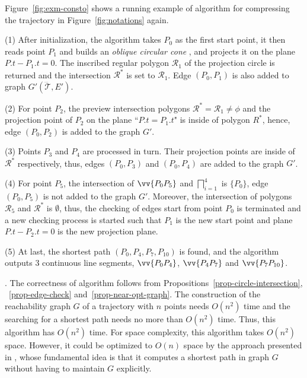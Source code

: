 \begin{example}
\label{exm-alg-conesto}
Figure~\ref{fig:exm-consto}  shows a running example of algorithm \cisto for compressing the trajectory  in Figure~\ref{fig:notations} again.


\sstab (1) After initialization, the \cisto algorithm takes $P_0$ as the first start point, it then reads point $P_1$ and builds an \emph{oblique circular cone} ,  and projects it on the plane $P.t-P_1.t=0$. The inscribed
regular polygon $\mathcal{R}_1$ of the projection circle is returned and the intersection $\mathcal{R}^*$ is set to $\mathcal{R}_1$.
Edge $(P_0,P_{1})$ is also added to graph $G'(\dddot{\mathcal{T}},E')$. 

\sstab (2) For point $P_2$, the preview intersection
polygons $\mathcal{R}^*=\mathcal{R}_1 \ne \phi$ and the projection point of $P_2$ on the plane ``$P.t = P_1.t$" is inside of polygon $R^*$, hence, edge $(P_0,P_{2})$ is added to the graph $G'$. 

\sstab (3) Points $P_3$ and $P_4$ are processed in turn. Their projection points are inside of $\mathcal{R}^*$ respectively, thus, edges $(P_0,P_{3})$ and $(P_0,P_{4})$ are added to the graph $G'$. 


\sstab (4) For point $P_5$, the intersection of $\vv{P_0P_{5}}$ and $\bigsqcap_{i=1}^{
  4}$ is $\{P_0\}$, edge
$(P_0,P_{5})$ is not added to the graph $G'$. 
Moreover, the intersection of polygons $\mathcal{R}_5$ and $\mathcal{R}^*$ is $\emptyset$, 
thus, the checking of edges start from point $P_0$ is terminated and a new checking process is started such that $P_1$ is the new start point and plane $P.t-P_2.t=0$ is the new projection plane.

\sstab (5) At last, the shortest path $(P_0, P_4, P_7, P_{10})$ is found, and the algorithm outputs 3 continuous line segments, \ie $\vv{P_0P_4}$, $\vv{P_4P_7}$ and $\vv{P_7P_{10}}$.
\end{example}



.
The correctness of algorithm \cisto follows from Propositions~\ref{prop-circle-intersection}, ~\ref{prop-edge-check} and~\ref{prop-near-opt-graph}.
%
The construction of the reachability graph $G$ of a trajectory with $n$ points needs $O(n^2)$ time and the searching for a shortest path needs no more than $O(n^2)$ time. Thus, this algorithm has $O(n^2)$ time. 
%
For space complexity, this algorithm takes $O(n^2)$ space. However, it could be optimized to $O(n)$ space by the approach presented in \cite{Chen:Space}, whose fundamental idea is that it computes a shortest path in graph $G$ without having to maintain $G$ explicitly.

